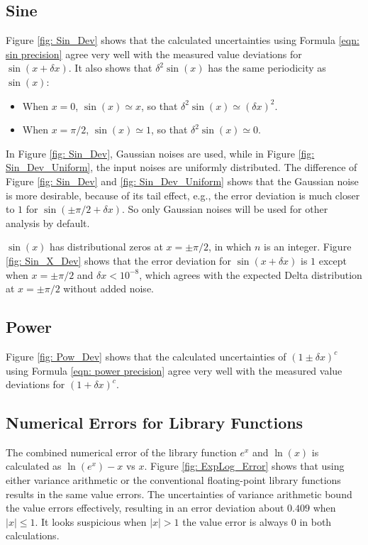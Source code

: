 \documentclass[twoside]{article}
\numberwithin{equation}{section}
\begin{document}
\subsection{Sine}

Figure \ref{fig: Sin_Dev} shows that the calculated uncertainties using Formula \eqref{eqn: sin precision} agree very well with the measured value deviations for $\sin(x + \delta x)$.
It also shows that $\delta^2 \sin(x)$ has the same periodicity as $\sin(x)$:
\begin{itemize}
\item When $x=0$, $\sin(x) \simeq x$, so that $\delta^2 \sin(x) \simeq (\delta x)^2$.
\item When $x=\pi/2$, $\sin(x) \simeq 1$, so that $\delta^2 \sin(x) \simeq 0$.
\end{itemize}

In Figure \ref{fig: Sin_Dev}, Gaussian noises are used, while in Figure \ref{fig: Sin_Dev_Uniform}, the input noises are uniformly distributed.
The difference of Figure \ref{fig: Sin_Dev} and \ref{fig: Sin_Dev_Uniform} shows that the Gaussian noise is more desirable, because of its tail effect, e.g., the error deviation is much closer to $1$ for $\sin(\pm \pi/2 + \delta x)$.
So only Gaussian noises will be used for other analysis by default.

$\sin(x)$ has distributional zeros at $x=\pm \pi/2$, in which $n$ is an integer.
Figure \ref{fig: Sin_X_Dev} shows that the error deviation for $\sin(x + \delta x)$ is $1$ except when $x=\pm \pi/2$ and $\delta x < 10^{-8}$, which agrees with the expected Delta distribution at $x = \pm \pi/2$ without added noise.



\subsection{Power}

Figure \ref{fig: Pow_Dev} shows that the calculated uncertainties of $(1 \pm \delta x)^c$ using Formula \eqref{eqn: power precision} agree very well with the measured value deviations for $(1 + \delta x)^c$.


\subsection{Numerical Errors for Library Functions}

The combined numerical error of the library function $e^x$ and $\ln(x)$ is calculated as $\ln(e^x) - x$ vs $x$.
Figure \ref{fig: ExpLog_Error} shows that using either variance arithmetic or the conventional floating-point library functions results in the same value errors.  
The uncertainties of variance arithmetic bound the value errors effectively, resulting in an error deviation about $0.409$ when $|x| \leq 1$.
It looks suspicious when $|x| > 1$ the value error is always $0$ in both calculations.
\end{document}
